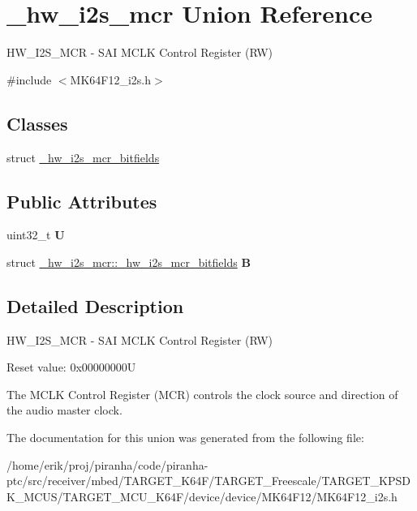 \hypertarget{union__hw__i2s__mcr}{}\section{\+\_\+hw\+\_\+i2s\+\_\+mcr Union Reference}
\label{union__hw__i2s__mcr}


H\+W\+\_\+\+I2\+S\+\_\+\+M\+CR -\/ S\+AI M\+C\+LK Control Register (RW)  




{\ttfamily \#include $<$M\+K64\+F12\+\_\+i2s.\+h$>$}

\subsection*{Classes}
\begin{DoxyCompactItemize}
\item 
struct \hyperlink{struct__hw__i2s__mcr_1_1__hw__i2s__mcr__bitfields}{\+\_\+hw\+\_\+i2s\+\_\+mcr\+\_\+bitfields}
\end{DoxyCompactItemize}
\subsection*{Public Attributes}
\begin{DoxyCompactItemize}
\item 
uint32\+\_\+t {\bfseries U}\hypertarget{union__hw__i2s__mcr_ac1960c5942550c6b37ac0f1863f20bd4}{}\label{union__hw__i2s__mcr_ac1960c5942550c6b37ac0f1863f20bd4}

\item 
struct \hyperlink{struct__hw__i2s__mcr_1_1__hw__i2s__mcr__bitfields}{\+\_\+hw\+\_\+i2s\+\_\+mcr\+::\+\_\+hw\+\_\+i2s\+\_\+mcr\+\_\+bitfields} {\bfseries B}\hypertarget{union__hw__i2s__mcr_a6607b2a7bb5037c9408e22594a98e796}{}\label{union__hw__i2s__mcr_a6607b2a7bb5037c9408e22594a98e796}

\end{DoxyCompactItemize}


\subsection{Detailed Description}
H\+W\+\_\+\+I2\+S\+\_\+\+M\+CR -\/ S\+AI M\+C\+LK Control Register (RW) 

Reset value\+: 0x00000000U

The M\+C\+LK Control Register (M\+CR) controls the clock source and direction of the audio master clock. 

The documentation for this union was generated from the following file\+:\begin{DoxyCompactItemize}
\item 
/home/erik/proj/piranha/code/piranha-\/ptc/src/receiver/mbed/\+T\+A\+R\+G\+E\+T\+\_\+\+K64\+F/\+T\+A\+R\+G\+E\+T\+\_\+\+Freescale/\+T\+A\+R\+G\+E\+T\+\_\+\+K\+P\+S\+D\+K\+\_\+\+M\+C\+U\+S/\+T\+A\+R\+G\+E\+T\+\_\+\+M\+C\+U\+\_\+\+K64\+F/device/device/\+M\+K64\+F12/M\+K64\+F12\+\_\+i2s.\+h\end{DoxyCompactItemize}
